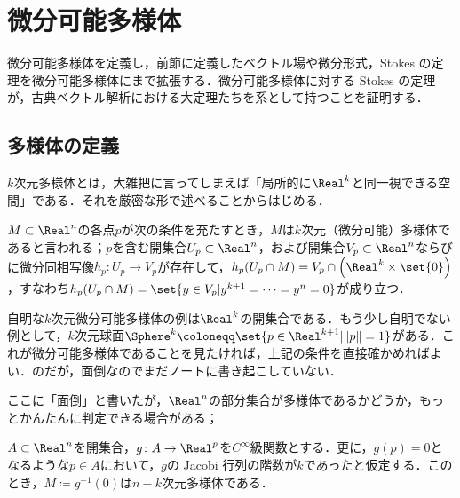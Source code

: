 \section{微分可能多様体}

微分可能多様体を定義し，前節に定義したベクトル場や微分形式，Stokes の定理を微分可能多様体にまで拡張する．微分可能多様体に対する Stokes の定理が，古典ベクトル解析における大定理たちを系として持つことを証明する．

\subsection{多様体の定義}

$k$次元多様体とは，大雑把に言ってしまえば「局所的に$\Real^k$と同一視できる空間」である．それを厳密な形で述べることからはじめる．

\begin{defi}
$M \subset \Real^n$の各点$p$が次の条件を充たすとき，$M$は$k$次元（微分可能）多様体であると言われる；$p$を含む開集合$U_p \subset \Real^n$，および開集合$V_p \subset \Real^n$ならびに微分同相写像$h_p \colon U_p \to V_p$が存在して，$h_p(U_p \cap M) = V_p \cap \left(\Real^k \times \set{0}\right)$，すなわち$h_p(U_p \cap M) = \set{y \in V_p | y^{k+1} = \dots = y^n = 0}$が成り立つ．
\end{defi}

\begin{exm}
自明な$k$次元微分可能多様体の例は$\Real^k$の開集合である．もう少し自明でない例として，$k$次元球面$\Sphere^k \coloneqq \set{p \in \Real^{k+1} | \|p\|=1}$がある．これが微分可能多様体であることを見たければ，上記の条件を直接確かめればよい．のだが，面倒なのでまだノートに書き起こしていない．
\end{exm}

ここに「面倒」と書いたが，$\Real^n$の部分集合が多様体であるかどうか，もっとかんたんに判定できる場合がある；

\begin{prop}
$A \subset \Real^n$を開集合，$g \colon A \to \Real^p$を$C^\infty$級関数とする．更に，$g(p)=0$となるような$p \in A$において，$g$の Jacobi 行列の階数が$k$であったと仮定する．このとき，$M \coloneqq g^{-1}(0)$は$n-k$次元多様体である．
\end{prop}

